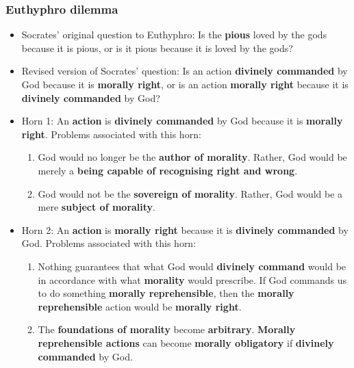 \documentclass[11pt]{article}
\begin{document}
\subsubsection{Euthyphro dilemma}
\label{sec:org2470cec}
\begin{itemize}
\item Socrates' original question to Euthyphro:
Is the \textbf{pious} loved by the gods because it is pious, or is it pious because it is loved by the gods?
\item Revised version of Socrates' question:
Is an action \textbf{divinely commanded} by God because it is \textbf{morally right}, or is an action \textbf{morally right} because it is \textbf{divinely commanded} by God?
\item Horn 1: An \textbf{action} is \textbf{divinely commanded} by God because it is \textbf{morally right}.
Problems associated with this horn:
\begin{enumerate}
\item God would no longer be the \textbf{author of morality}. Rather, God would be merely a \textbf{being capable of recognising right and wrong}.
\item God would not be the \textbf{sovereign of morality}. Rather, God would be a mere \textbf{subject of morality}.
\end{enumerate}
\item Horn 2: An \textbf{action} is \textbf{morally right} because it is \textbf{divinely commanded} by God.
Problems associated with this horn:
\begin{enumerate}
\item Nothing guarantees that what God would \textbf{divinely command} would be in accordance with what \textbf{morality} would prescribe. If God commands us to do something \textbf{morally reprehensible}, then the \textbf{morally reprehensible} action would be \textbf{morally right}.
\item The \textbf{foundations of morality} become \textbf{arbitrary}. \textbf{Morally reprehensible actions} can become \textbf{morally obligatory} if \textbf{divinely commanded} by God.
\end{enumerate}
\end{itemize}

 \newpage
\end{document}
